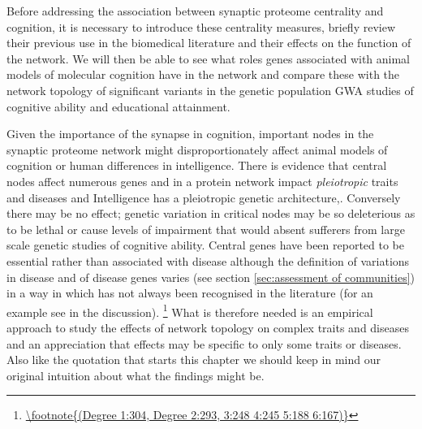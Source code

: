 Before addressing the association between synaptic proteome centrality and cognition, it is necessary to introduce these centrality measures, briefly review their previous use in the biomedical literature and their effects on the function of the network. We will then be able to see what roles genes associated with animal models of molecular cognition have in the network and compare these with the network topology of significant variants in the genetic population GWA studies of cognitive ability and educational attainment.   


 
Given the importance of the synapse in cognition, important nodes in the synaptic proteome network might disproportionately affect animal models of cognition or human differences in intelligence. There is evidence that central nodes affect numerous genes and in a protein network impact \textit{pleiotropic} traits and diseases \cite{chavali2010network} and Intelligence has a pleiotropic genetic architecture\cite{plomin2015genetics},\cite{visscher2016plethora}.  Conversely there may be no effect; genetic variation in critical nodes may be so deleterious as to be  lethal or cause levels of impairment that would absent sufferers from large scale genetic studies of cognitive ability. Central genes have been reported to be essential rather than associated with disease\cite{barabasi2011network} although the definition of variations in disease and of disease genes varies (see section \ref{sec:assessment of communities}) in a way in which has not always been recognised in the literature (for an example see \cite{goh2007human} in the discussion).
\footnote{\url{\footnote{(Degree 1:304, Degree 2:293, 3:248 4:245 5:188 6:167)}}}
 What is therefore needed is an empirical approach to study the effects of network topology on complex traits and diseases and an appreciation that effects may be specific to only some traits or diseases. Also like the quotation that starts this chapter we should keep in mind our original intuition about what the findings might be.
 
 
 
 

 


